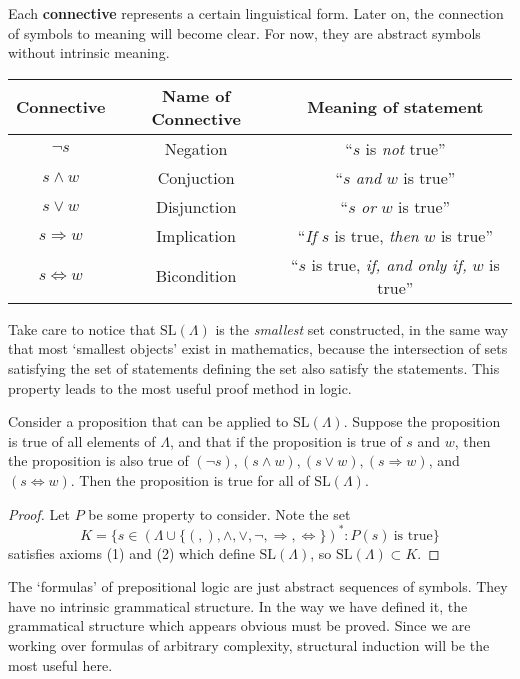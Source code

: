 Each {\bf connective} represents a certain linguistical form. Later on, the connection of symbols to meaning will become clear. For now, they are abstract symbols without intrinsic meaning.
%
\begin{center}
\begin{tabular}{| c | c | c |}
    \hline Connective & Name of Connective & Meaning of statement \\
    \hline $\neg s$ & Negation & ``$s$ is {\it not} true''\\
    $s \wedge w$ & Conjuction & ``$s$ {\it and} $w$ is true''\\
    $s \vee w$ & Disjunction & ``$s$ {\it or} $w$ is true''\\
    $s \Rightarrow w$ & Implication & ``{\it If} $s$ is true, {\it then} $w$ is true''\\
    $s \Leftrightarrow w$ & Bicondition & ``$s$ is true, {\it if, and only if,} $w$ is true''\\
    \hline
\end{tabular}
\end{center}

Take care to notice that $\text{SL}(\Lambda)$ is the {\it smallest} set constructed, in the same way that most `smallest objects' exist in mathematics, because the intersection of sets satisfying the set of statements defining the set also satisfy the statements. This property leads to the most useful proof method in logic.

\begin{theorem}
    Consider a proposition that can be applied to $\text{SL}(\Lambda)$. Suppose the proposition is true of all elements of $\Lambda$, and that if the proposition is true of $s$ and $w$, then the proposition is also true of $(\neg s), (s \wedge w), (s \vee w), (s \Rightarrow w)$, and $(s \Leftrightarrow w)$. Then the proposition is true for all of $\text{SL}(\Lambda)$.
\end{theorem}
\begin{proof}
    Let $P$ be some property to consider. Note the set
    \[ K = \{ s \in (\Lambda \cup \{ (, ), \wedge, \vee, \neg, \Rightarrow, \Leftrightarrow \})^* : P(s)\ \text{is true} \} \]
    satisfies axioms (1) and (2) which define $\text{SL}(\Lambda)$, so $\text{SL}(\Lambda) \subset K$.
\end{proof}

The `formulas' of prepositional logic are just abstract sequences of symbols. They have no intrinsic grammatical structure. In the way we have defined it, the grammatical structure which appears obvious must be proved. Since we are working over formulas of arbitrary complexity, structural induction will be the most useful here.

